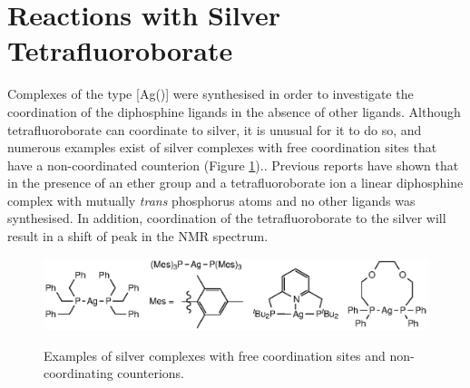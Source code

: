 
\section{Reactions with Silver Tetrafluoroborate}

Complexes of the type [Ag(\tBuxantphos)] were synthesised in order to investigate the coordination of the diphosphine ligands in the absence of other ligands.  Although tetrafluoroborate can coordinate to silver, it is unusual for it to do so, and numerous examples exist of silver complexes with free coordination sites that have a non-coordinated  counterion (Figure \ref{Linearsilver}).\cite{Ainscough2011, Bayler1996, Vlugt2009b}.  Previous reports have shown that in the presence of an ether group and a tetrafluoroborate ion a linear diphosphine complex with mutually \emph{trans} phosphorus atoms and no other ligands was synthesised.\cite{Heuer2000}  In addition, coordination of the tetrafluoroborate to the silver will result in a shift of peak in the \fluorine{} NMR spectrum.

\begin{figure}[htbp]
\begin{center}
\vspace{0.5cm}
\includegraphics{../Figures/Linearsilvercomplexes.eps}
\caption[Silver complexes with free coordination sites and  counterions]{Examples of silver complexes with free coordination sites and non-coordinating  counterions.\cite{Ainscough2011, Bayler1996, Vlugt2009b}}
\vspace{0.2cm}
\label{Linearsilver}
\vspace{0.2cm}
\end{center}
\end{figure}
\vspace{0.2cm}

